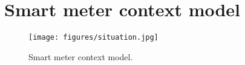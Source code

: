 \section{Smart meter context model}
\begin{figure}
  \texttt{[image: figures/situation.jpg]}
  \caption{Smart meter context model.}
  
  \label{sm_model}
\end{figure}


